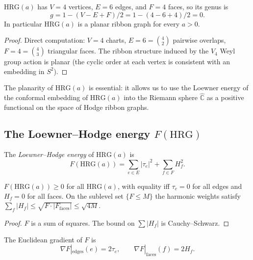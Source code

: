 \begin{lemma}
\label{lem:hrg_genus}
$\mathrm{HRG}(a)$ has $V=4$ vertices, $E=6$ edges, and $F=4$ faces, so
its genus is
\[
g=1-(V-E+F)/2=1-(4-6+4)/2=0.
\]
In particular $\mathrm{HRG}(a)$ is a planar ribbon graph for every
$a>0$.
\end{lemma}

\begin{proof}
Direct computation: $V=4$ charts, $E=6=\binom{4}{2}$ pairwise overlaps,
$F=4=\binom{4}{3}$ triangular faces. The ribbon structure induced by
the $V_{4}$ Weyl group action is planar (the cyclic order at each
vertex is consistent with an embedding in $S^{2}$).
\end{proof}

\begin{remark}
The planarity of $\mathrm{HRG}(a)$ is essential: it allows us to use
the Loewner energy of the conformal embedding of $\mathrm{HRG}(a)$
into the Riemann sphere $\widehat{\mathbb{C}}$ as a positive
functional on the space of Hodge ribbon graphs.
\end{remark}

\subsection{The Loewner--Hodge energy $F(\mathrm{HRG})$}
\label{ssec:loewner_hodge}

\begin{definition}
\label{def:loewner_hodge}
The \emph{Loewner--Hodge energy} of $\mathrm{HRG}(a)$ is
\[
F(\mathrm{HRG}(a))=\sum_{e\in E}|\tau_{e}|^{2}+\sum_{f\in F}H_{f}^{2}.
\]
\end{definition}

\begin{lemma}
\label{lem:F_positivity}
$F(\mathrm{HRG}(a))\ge 0$ for all $\mathrm{HRG}(a)$, with equality iff
$\tau_{e}=0$ for all edges and $H_{f}=0$ for all faces. On the sublevel
set $\{F\le M\}$ the harmonic weights satisfy
$\sum_{f}|H_{f}|\le\sqrt{F\cdot|F_{\mathrm{faces}}|}\le\sqrt{4M}$.
\end{lemma}

\begin{proof}
$F$ is a sum of squares. The bound on $\sum|H_{f}|$ is Cauchy--Schwarz.
\end{proof}

\begin{definition}[Gradient of $F$]
\label{def:grad_F}
The Euclidean gradient of $F$ is
\[
\nabla F|_{\mathrm{edges}}(e)=2\tau_{e},\qquad
\nabla F|_{\mathrm{faces}}(f)=2H_{f}.
\]
\end{definition}

